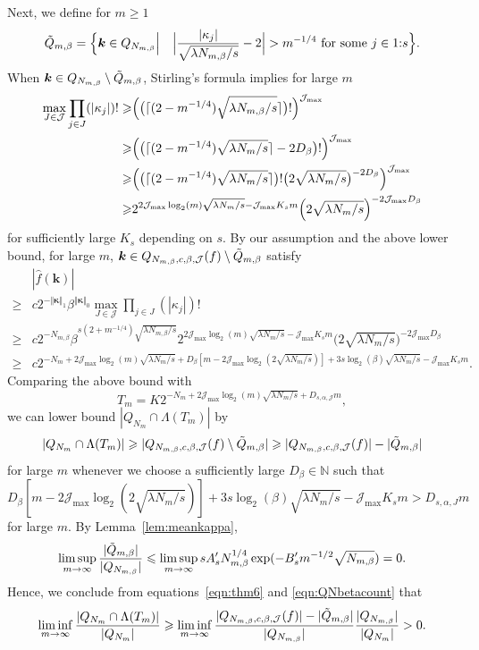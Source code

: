 \documentclass{article}
\theoremstyle{definition}
\renewcommand{\leq}{\leqslant}
\renewcommand{\geq}{\geqslant}
\newcommand{\cj}{\mathcal{J}}
\newcommand{\natu}{\mathbb{N}}
\newcommand{\bsk}{\boldsymbol{k}}
\newcommand{\bskappa}{\boldsymbol{\kappa}}
\begin{document}
Next, we define for $m \geq 1$
\begin{equation*}
    \Tilde{Q}_{m,\beta}=\Bigl\{\bsk\in Q_{N_{m,\beta}}\Big \vert \hspace{1em}\Bigl|\frac{|\kappa_j|}{\sqrt{\lambda N_{m,\beta}/s}}-2\Bigr|>m^{-1/4}\text{ for some } j \in 1{:}s\Bigr\}.
\end{equation*}
When $\bsk \in Q_{N_{m,\beta}}\setminus \Tilde{Q}_{m,\beta}$, Stirling's formula implies for large $m$
\begin{align*}
    \max_{J\in \cj} \prod_{j\in J} (|\kappa_j|)!\geq &\Bigl(\big(\lceil (2-m^{-1/4})\sqrt{\lambda N_{m,\beta}/s}\rceil\big)!\Bigr)^{\cj_{\max}}\\
    \geq & \Bigl(\big(\lceil (2-m^{-1/4})\sqrt{\lambda N_m/s}\rceil-2D_\beta\big)!\Bigr)^{\cj_{\max}}\\
    \geq & \Bigl(\big(\lceil (2-m^{-1/4})\sqrt{\lambda N_m/s}\rceil\big)! \big(2\sqrt{\lambda N_m/s}\big)^{-2D_\beta}\Bigr)^{\cj_{\max}}\\
     \geq &2^{2\cj_{\max}\log_2(m)\sqrt{\lambda N_m/s}-\cj_{\max}K_sm} \Big(2\sqrt{\lambda N_m/s}\Big)^{-2\cj_{\max}D_\beta}
\end{align*}
for sufficiently large $K_s$ depending on $s$. By our assumption and the above lower bound, for large $m$, $\bsk \in Q_{ N_{m,\beta},c,\beta,\cj}(f)\setminus \Tilde{Q}_{m,\beta}$ satisfy
\begin{align*}
    &|\hat{f}(\bsk)|\\
    \geq & c2^{-\Vert\bskappa\Vert_1}\beta^{\Vert\bskappa\Vert_0}\max_{J\in \cj} \prod_{j\in J} (|\kappa_j|)!\\
    \geq & c2^{-N_{m,\beta}} \beta^{s (2+m^{-1/4})\sqrt{\lambda N_{m,\beta}/s} } 2^{2\cj_{\max}\log_2(m)\sqrt{\lambda N_m/s}-\cj_{\max}K_s m  }\Big(2\sqrt{\lambda N_m/s}\Big)^{-2\cj_{\max}D_\beta} \\
     \geq &c 2^{-N_m+2\cj_{\max}\log_2(m)\sqrt{\lambda N_m/s}+D_\beta [m-2\cj_{\max}\log_2(2\sqrt{\lambda N_m/s})]+3s\log_2(\beta)\sqrt{\lambda N_m/s}-\cj_{\max}K_s m}.
\end{align*}
Comparing the above bound with
$$T_m=K2^{-N_m+2 \cj_{\max}\log_2(m)\sqrt{\lambda N_m/s}+D_{s,\alpha,\cj}m},$$
we can lower bound $|Q_{N_m}\cap \Lambda(T_m)|$ by
$$|Q_{N_m}\cap \Lambda(T_m)|\geq |Q_{ N_{m,\beta},c,\beta,\cj}(f)\setminus \Tilde{Q}_{m,\beta}| \geq |Q_{ N_{m,\beta},c,\beta,\cj}(f)|-|\Tilde{Q}_{m,\beta} |$$
for large $m$ whenever we choose a sufficiently large $D_\beta\in \natu$ such that
$$D_\beta \left[m-2\cj_{\max}\log_2(2\sqrt{\lambda N_m/s})\right]+3s\log_2(\beta)\sqrt{\lambda N_m/s}-\cj_{\max}K_s m> D_{s,\alpha,J}m$$
for large $m$. By Lemma~\ref{lem:meankappa}, 
$$\limsup_{m\to\infty}\frac{|\Tilde{Q}_{m,\beta} |}{|Q_{N_{m,\beta}}|}\leq \limsup_{m\to\infty} sA'_sN_{m,\beta}^{1/4}\exp(-B'_s m^{-1/2} \sqrt{N_{m,\beta}})=0.$$
Hence, we conclude from equations~\eqref{eqn:thm6} and \eqref{eqn:QNbetacount} that
$$ \liminf_{m\to\infty}\frac{|Q_{N_m}\cap \Lambda(T_m)|}{|Q_{N_m}|}\geq \liminf_{m\to\infty}\frac{|Q_{ N_{m,\beta},c,\beta,\cj}(f)|-|\Tilde{Q}_{m,\beta} |}{|Q_{N_{m,\beta}}|} \frac{|Q_{N_{m,\beta}}|}{|Q_{N_m}|}>0.$$
\end{document}
